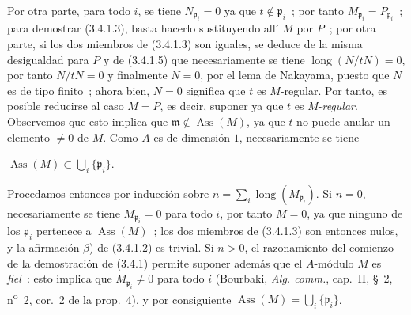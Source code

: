 Por otra parte, para todo $i$, se tiene $N_{\mathfrak p_i}=0$ ya que
$t\notin\mathfrak p_i$~; por tanto $M_{\mathfrak p_i}=P_{\mathfrak p_i}$~; para
demostrar (3.4.1.3), basta hacerlo sustituyendo allí $M$ por $P$~; por
otra parte, si los dos miembros de (3.4.1.3) son iguales, se deduce de la
misma desigualdad para $P$ y de (3.4.1.5) que necesariamente se tiene
$\operatorname{long}(N/tN)=0$, por tanto $N/tN=0$ y finalmente $N=0$, por el lema
de Nakayama, puesto que $N$ es de tipo finito~; ahora bien, $N=0$ significa que
$t$ es $M$-regular. Por tanto, es posible reducirse al caso $M=P$, es decir,
suponer ya que $t$ es $M$-\emph{regular}. Observemos que esto implica que
$\mathfrak m\notin\operatorname{Ass}(M)$, ya que $t$ no puede anular un
elemento $\neq0$ de $M$. Como $A$ es de dimensión $1$, necesariamente se tiene

$\operatorname{Ass}(M)\subset\bigcup_i\{\mathfrak p_i\}$.

Procedamos entonces por inducción sobre
$n=\sum_i\operatorname{long}(M_{\mathfrak p_i})$. Si $n=0$, necesariamente se tiene
$M_{\mathfrak p_i}=0$ para todo $i$, por tanto $M=0$, ya que ninguno de los
$\mathfrak p_i$ pertenece a $\operatorname{Ass}(M)$~; los dos miembros de
(3.4.1.3) son entonces nulos, y la afirmación $\beta$) de (3.4.1.2) es
trivial. Si $n>0$, el razonamiento del comienzo de la demostración de (3.4.1)
permite suponer además que el $A$-módulo $M$ es \emph{fiel}~: esto implica que
$M_{\mathfrak p_i}\neq0$ para todo $i$ (Bourbaki, \emph{Alg. comm.}, cap.~II,
\S~2, n\textsuperscript{o}~2, cor.~2 de la prop.~4), y por consiguiente
$\operatorname{Ass}(M)=\bigcup_i\{\mathfrak p_i\}$.

